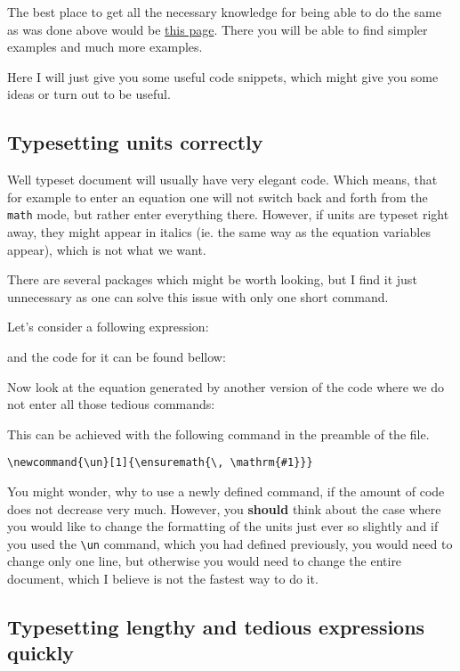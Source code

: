 The best place to get all the necessary knowledge for being able to do the same
as was done above would be 
\href{https://secure.wikimedia.org/wikibooks/en/wiki/LaTeX/Customizing_LaTeX#New_commands}{this
page}. There you will be able to find simpler examples and much more examples.

Here I will just give you some useful code snippets, which might give you some
ideas or turn out to be useful.

\subsection{Typesetting units correctly}

Well typeset document will usually have very elegant code. Which means, that for
example to enter an equation one will not switch back and forth from the
\verb|math| mode, but rather enter everything there. However, if units are
typeset right away, they might appear in italics (ie. the same way as the
equation variables appear), which is not what we want.

There are several packages which might be worth looking, but I find it just
unnecessary as one can solve this issue with only one short command.

Let's consider a following expression:

and the code for it can be found bellow:


Now look at the equation generated by another version of the code where we do
not enter all those tedious commands:



This can be achieved with the following command in the preamble of the file.
\begin{lstlisting}
\newcommand{\un}[1]{\ensuremath{\, \mathrm{#1}}}
\end{lstlisting}

You might wonder, why to use a newly defined command, if the amount of code
does not decrease very much. However, you \textbf{should} think about the case
where you would like to change the formatting of the units just ever so slightly
and if you used the \verb|\un| command, which you had defined previously, you
would need to change only one line, but otherwise you would need to change the
entire document, which I believe is not the fastest way to do it.

\subsection{Typesetting lengthy and tedious expressions quickly}

